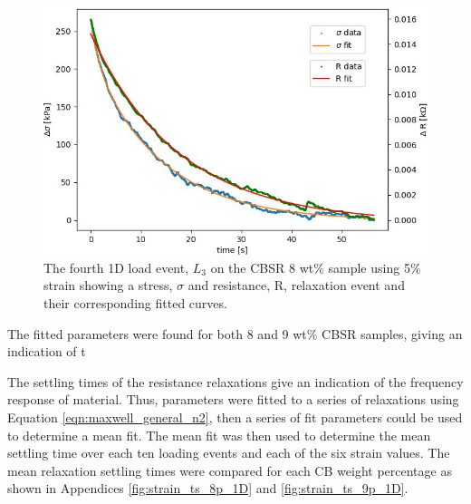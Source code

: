 \begin{figure}[H]
    \centering
    \includegraphics[width=0.7\linewidth]{Figures/Push event 3 - CBSR 8 wt 5p strain - 1D compression test.jpg}
    \caption{The fourth 1D load event, $L_{3}$ on the CBSR 8 wt\% sample using 5\% strain showing a stress, $\sigma$ and resistance, R, relaxation event and their corresponding fitted curves.}
    \label{fig:push_event_relax_example}
\end{figure}


The fitted parameters were found for both 8 and 9 wt\% CBSR samples, giving an indication of t

The settling times of the resistance relaxations give an indication of the frequency response of material. Thus, parameters were fitted to a series of relaxations using Equation \ref{eqn:maxwell_general_n2}, then a series of fit parameters could be used to determine a mean fit. The mean fit was then used to determine the mean settling time over each ten loading events and each of the six strain values. The mean relaxation settling times were compared for each CB weight percentage as shown in Appendices \ref{fig:strain_ts_8p_1D} and \ref{fig:strain_ts_9p_1D}.

